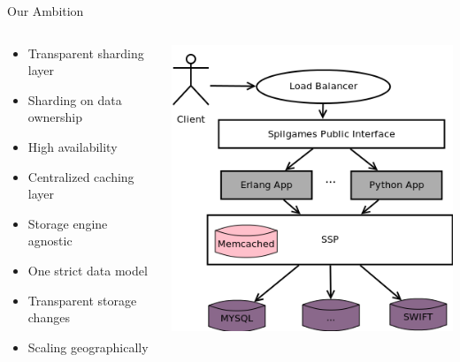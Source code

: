 \documentclass[aspectratio=169]{beamer}
\begin{document}
\begin{frame}{Our Ambition}
    \begin{columns}
        \begin{column}[c]{0.5\textwidth}
            \begin{itemize}
                \item Transparent sharding layer
                \item Sharding on data ownership
                \item High availability
                \item Centralized caching layer
                \item Storage engine agnostic
                \item One strict data model
                \item Transparent storage changes
                \item Scaling geographically
            \end{itemize}
        \end{column}
        \begin{column}[c]{0.5\textwidth}
            \includegraphics[width=\textwidth]{images/newstorageusage.png}
        \end{column}
    \end{columns}
\end{frame}
\end{document}
